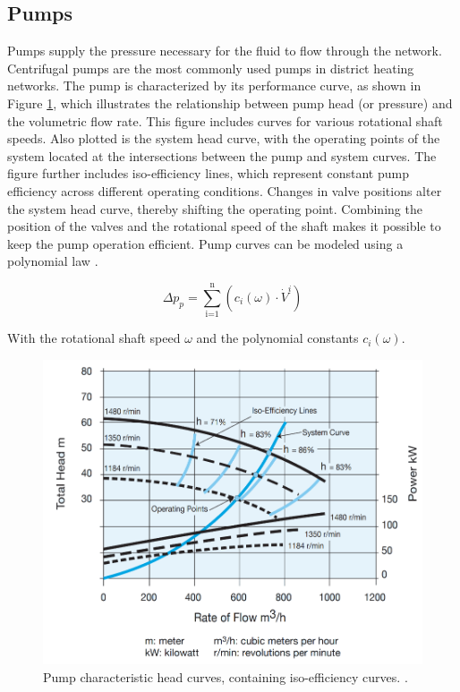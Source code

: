 \subsection{Pumps}
Pumps supply the pressure necessary for the fluid to flow through the network. Centrifugal pumps are the most commonly used pumps in district heating networks. The pump is characterized by its performance curve, as shown in Figure \ref{fig::pumpcharacteristic}, which illustrates the relationship between pump head (or pressure) and the volumetric flow rate. This figure includes curves for various rotational shaft speeds. Also plotted is the system head curve, with the operating points of the system located at the intersections between the pump and system curves. The figure further includes iso-efficiency lines, which represent constant pump efficiency across different operating conditions. Changes in valve positions alter the system head curve, thereby shifting the operating point. Combining the position of the valves and the rotational speed of the shaft makes it possible to keep the pump operation efficient. Pump curves can be modeled using a polynomial law \cite{echtephdthesis}. 

\begin{equation}\label{eq::pumpchar}
    \Delta p_{p} = \sum^{\text{n}}_{\text{i=1}} \left( c_i(\omega) \cdot \dot{V}^{i} \right)
\end{equation}

With the rotational shaft speed $\omega$ and the polynomial constants $c_i(\omega)$. 

\begin{figure}[h!]
    \centering
    \includegraphics[width=0.6\linewidth]{Literature Survey - DCSC template/figuresLIT/pumpgoed.png}
    \caption{Pump characteristic head curves, containing iso-efficiency curves. .}
    \label{fig::pumpcharacteristic}
\end{figure}

